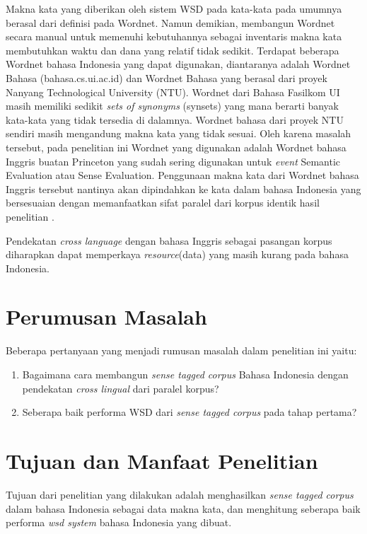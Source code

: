 Makna kata yang diberikan oleh sistem WSD pada kata-kata pada umumnya berasal dari definisi pada Wordnet. Namun demikian, membangun Wordnet secara manual untuk memenuhi kebutuhannya sebagai inventaris makna kata membutuhkan waktu dan dana yang relatif tidak sedikit. Terdapat beberapa Wordnet bahasa Indonesia yang dapat digunakan, diantaranya adalah Wordnet Bahasa (bahasa.cs.ui.ac.id) dan Wordnet Bahasa yang berasal dari proyek Nanyang Technological University (NTU).  Wordnet dari Bahasa Fasilkom UI masih memiliki sedikit \textit{sets of synonyms} (synsets) yang mana berarti banyak kata-kata yang tidak tersedia di dalamnya. Wordnet bahasa dari proyek NTU sendiri masih mengandung makna kata yang tidak sesuai. Oleh karena masalah tersebut, pada penelitian ini Wordnet yang digunakan adalah Wordnet bahasa Inggris buatan Princeton yang sudah sering digunakan untuk \textit{event} Semantic Evaluation atau Sense Evaluation. Penggunaan makna kata dari Wordnet bahasa Inggris tersebut nantinya akan dipindahkan ke kata dalam bahasa Indonesia yang bersesuaian dengan memanfaatkan sifat paralel dari korpus identik hasil penelitian \citep{larasati2012identic}.

Pendekatan \textit{cross language} dengan bahasa Inggris sebagai pasangan korpus diharapkan dapat memperkaya \textit{resource}(data) yang masih kurang pada bahasa Indonesia. 
\section{Perumusan Masalah}
Beberapa pertanyaan yang menjadi rumusan masalah dalam penelitian ini yaitu:
\begin{enumerate}
	\item Bagaimana cara membangun \textit{sense tagged corpus} Bahasa Indonesia dengan pendekatan \textit{cross lingual} dari paralel korpus?
	\item Seberapa baik performa WSD dari \textit{sense tagged corpus} pada tahap pertama?
\end{enumerate}

\section{Tujuan dan Manfaat Penelitian}
Tujuan dari penelitian yang dilakukan adalah menghasilkan \textit{sense tagged corpus} dalam bahasa Indonesia sebagai data makna kata, dan menghitung seberapa baik performa \textit{wsd system} bahasa Indonesia yang dibuat.

